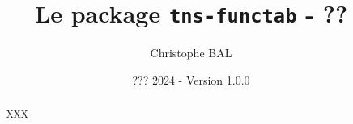 \title{Le package \texttt{tns-functab} - ??}
\author{Christophe BAL}
\date{??? 2024 - Version 1.0.0}

\maketitle

\begin{abstract}
XXX
\end{abstract}
